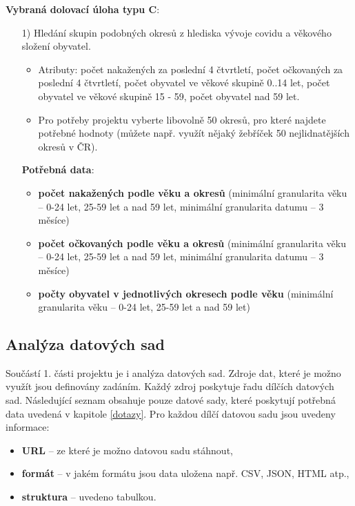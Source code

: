 \documentclass[12pt]{article}
\begin{document}
\hspace{1cm}

\textbf{Vybraná dolovací úloha typu C}:
\begin{itemize}
    \item[1)] Hledání skupin podobných okresů z hlediska vývoje covidu a věkového složení obyvatel.
    \begin{itemize}
        \item Atributy: počet nakažených za poslední 4 čtvrtletí, počet očkovaných za poslední 4 čtvrtletí, počet obyvatel ve věkové skupině 0..14 let, počet obyvatel ve věkové skupině 15 - 59, počet obyvatel nad 59 let.
        \item Pro potřeby projektu vyberte libovolně 50 okresů, pro které najdete potřebné hodnoty (můžete např. využít nějaký žebříček 50 nejlidnatějších okresů v ČR).
    \end{itemize}
    
    \item[] \textbf{Potřebná data}:
    \begin{itemize}
        \item \textbf{počet nakažených podle věku a okresů} (minimální granularita věku -- 0-24 let, 25-59 let a nad 59 let, minimální granularita datumu -- 3 měsíce)
        \item \textbf{počet očkovaných podle věku a okresů} (minimální granularita věku -- 0-24 let, 25-59 let a nad 59 let, minimální granularita datumu -- 3 měsíce)
        \item \textbf{počty obyvatel v jednotlivých okresech podle věku} (minimální granularita věku -- 0-24 let, 25-59 let a nad 59 let)
    \end{itemize}
\end{itemize}

\newpage
\subsection{Analýza datových sad}
Součástí 1. části projektu je i analýza datových sad. Zdroje dat, které je možno využít jsou definovány zadáním. Každý zdroj poskytuje řadu dílčích datových sad. Následující seznam obsahuje pouze datové sady, které poskytují potřebná data uvedená v kapitole \ref{dotazy}. Pro každou dílčí datovou sadu jsou uvedeny informace:
\begin{itemize}
    \item \textbf{URL} -- ze které je možno datovou sadu stáhnout,
    \item \textbf{formát} -- v jakém formátu jsou data uložena např. CSV, JSON, HTML atp.,
    \item \textbf{struktura} -- uvedeno tabulkou.
\end{itemize}
\end{document}
